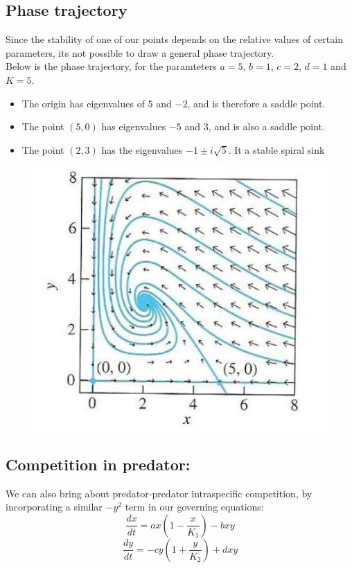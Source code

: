 \documentclass{article}
\begin{document}
\subsection{Phase trajectory}
Since the stability of one of our points depends on the relative values of certain parameters, its not possible to draw a general phase trajectory.
\\
Below is the phase trajectory, for the paramteters $a = 5$,  $b = 1$, $c = 2$, $d = 1$ and $K = 5$.

\begin{itemize}
    \item The origin has eigenvalues of $5$ and $-2$, and is therefore a saddle point.
    \item The point $(5, 0)$ has eigenvalues $-5$ and $3$, and is also a saddle point.
    \item The point $(2, 3)$ has the eigenvalues $-1 \pm i\sqrt{5}$. It a stable spiral sink
\end{itemize}

\begin{figure}[h]
    \centering
    \includegraphics[scale = 0.9]{logistic_grow.png}
    \caption{}
    \label{fig:my_label}
\end{figure}

\subsection{Competition in predator:}
We can also bring about predator-predator intraspecific competition, by incorporating a similar $-y^2$ term in our governing equations:
$$\frac{dx}{dt} = ax\left (1 - \frac{x}{K_1}\right) - bxy$$
$$\frac{dy}{dt} = -cy\left(1 + \frac{y}{K_2}\right) + dxy$$
\end{document}
